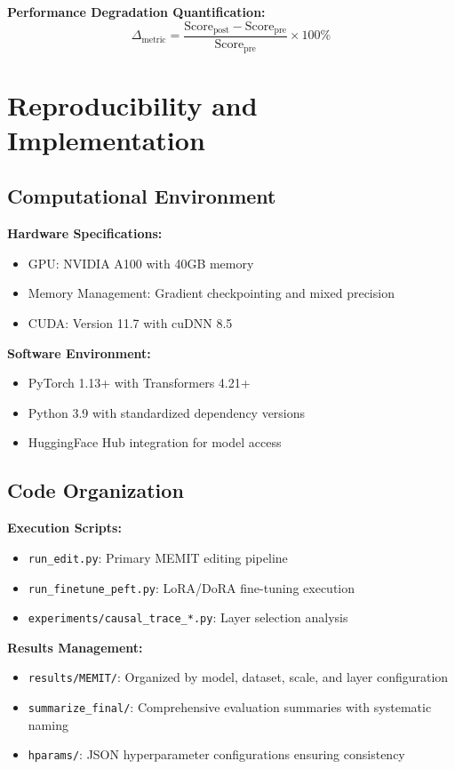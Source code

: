 \textbf{Performance Degradation Quantification:}
\begin{equation}
\Delta_{\text{metric}} = \frac{\text{Score}_{\text{post}} - \text{Score}_{\text{pre}}}{\text{Score}_{\text{pre}}} \times 100\%
\end{equation}

\section{Reproducibility and Implementation}

\subsection{Computational Environment}

\textbf{Hardware Specifications:}
\begin{itemize}
    \item GPU: NVIDIA A100 with 40GB memory
    \item Memory Management: Gradient checkpointing and mixed precision
    \item CUDA: Version 11.7 with cuDNN 8.5
\end{itemize}

\textbf{Software Environment:}
\begin{itemize}
    \item PyTorch 1.13+ with Transformers 4.21+
    \item Python 3.9 with standardized dependency versions
    \item HuggingFace Hub integration for model access
\end{itemize}

\subsection{Code Organization}

\textbf{Execution Scripts:}
\begin{itemize}
    \item \texttt{run\_edit.py}: Primary MEMIT editing pipeline
    \item \texttt{run\_finetune\_peft.py}: LoRA/DoRA fine-tuning execution
    \item \texttt{experiments/causal\_trace\_*.py}: Layer selection analysis
\end{itemize}

\textbf{Results Management:}
\begin{itemize}
    \item \texttt{results/MEMIT/}: Organized by model, dataset, scale, and layer configuration
    \item \texttt{summarize\_final/}: Comprehensive evaluation summaries with systematic naming
    \item \texttt{hparams/}: JSON hyperparameter configurations ensuring consistency
\end{itemize}

